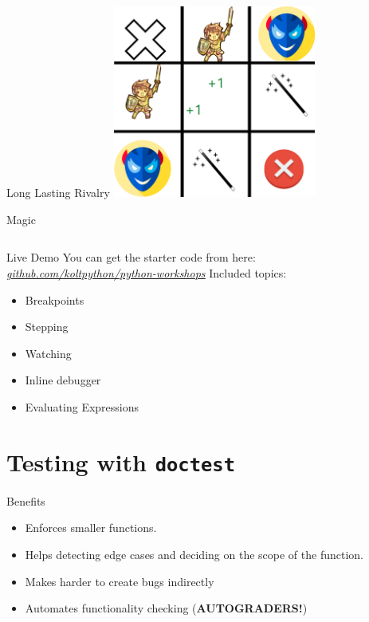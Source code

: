   \begin{frame}{Long Lasting Rivalry}
    \centering
    \includegraphics[width=0.5\textwidth]{images/matrix.png}
  \end{frame}
   
   \begin{frame}{Magic}
     \LARGE
     \inputminted[frame=single,framesep=2pt]{python3}{magic.py}
   \end{frame}

    \begin{frame}{Live Demo}
      \LARGE
      You can get the starter code from here:\\
      \href{https://kinolien.github.io/gitzip/?download=koltpython/python-workshops/tree/master/3-SL-Training/starter}{\textit{\underline{github.com/koltpython/python-workshops}}}
      \pause
      Included topics:
      \begin{itemize}
        \item Breakpoints
        \item Stepping
        \item Watching
        \item Inline debugger
        \item Evaluating Expressions
      \end{itemize}
    \end{frame}

    \section{Testing with \texttt{doctest}}

    \begin{frame}{Benefits}
      \LARGE
      \begin{itemize}
        \item Enforces smaller functions.
        \pause
        \item Helps detecting edge cases and deciding on the scope of the function.
        \pause
        \item Makes harder to create bugs indirectly
        \pause
        \item Automates functionality checking (\textbf{AUTOGRADERS!})
      \end{itemize}
    \end{frame}

